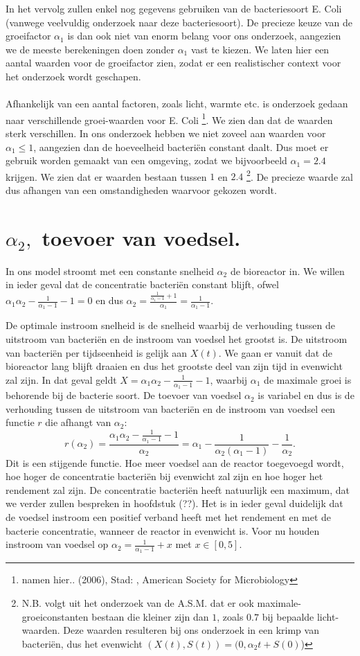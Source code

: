 In het vervolg zullen enkel nog gegevens gebruiken van de bacteriesoort E. Coli (vanwege veelvuldig onderzoek naar deze bacteriesoort). De precieze keuze van de groeifactor $\alpha_1$ is dan ook niet van enorm belang voor ons onderzoek, aangezien we de meeste berekeningen doen zonder $\alpha_1$ vast te kiezen. We laten hier een aantal waarden voor de groeifactor zien, zodat er een realistischer context voor het onderzoek wordt geschapen. 
\\
\\
Afhankelijk van een aantal factoren, zoals licht, warmte etc. is onderzoek gedaan naar verschillende groei-waarden voor E. Coli \footnote{namen hier.. (2006), Stad: , American Society for Microbiology}. We zien dan dat de waarden sterk verschillen. In ons onderzoek hebben we niet zoveel aan waarden voor $\alpha_1\leq1$, aangezien dan de hoeveelheid bacteri\"en constant daalt. Dus moet er gebruik worden gemaakt van een omgeving, zodat we bijvoorbeeld $\alpha_1 = 2.4$ krijgen. We zien dat er waarden bestaan tussen $1$ en $2.4$ \footnote{N.B. volgt uit het onderzoek van de A.S.M. dat er ook maximale-groeiconstanten bestaan die kleiner zijn dan $1$, zoals $0.7$ bij bepaalde licht-waarden. Deze waarden resulteren bij ons onderzoek in een krimp van bacteri\"en, dus het evenwicht $(X(t), S(t)) = (0, \alpha_2t + S(0)$) }. De precieze waarde zal dus afhangen van een omstandigheden waarvoor gekozen wordt.


\section{$\alpha_2,$ toevoer van voedsel.}
In ons model stroomt met een constante snelheid $\alpha_2$ de bioreactor in. We willen in ieder geval dat de concentratie bacteri\"en constant blijft, ofwel $\alpha_1\alpha_2-\frac{1}{\alpha_1-1}-1 = 0$ en dus $\alpha_2 = \frac{\frac{1}{\alpha_1-1}+1}{\alpha_1}=\frac{1}{\alpha_1-1}$.

De optimale instroom snelheid is de snelheid waarbij de verhouding tussen de uitstroom van bacteri\"en en de instroom van voedsel het grootst is. De uitstroom van bacteri\"en per tijdseenheid is gelijk aan $X(t)$. We gaan er vanuit dat de bioreactor lang blijft draaien en dus het grootste deel van zijn tijd in evenwicht zal zijn. In dat geval geldt $X = \alpha_1\alpha_2-\frac{1}{\alpha_1-1}-1$, waarbij $\alpha_1$ de maximale groei is behorende bij de bacterie soort. De toevoer van voedsel $\alpha_2$ is variabel en dus is de verhouding tussen de uitstroom van bacteri\"en en de instroom van voedsel een functie $r$ die afhangt van $\alpha_2$:
\[r(\alpha_2) = \frac{\alpha_1\alpha_2-\frac{1}{\alpha_1-1}-1}{\alpha_2} = \alpha_1-\frac{1}{\alpha_2(\alpha_1-1)}-\frac{1}{\alpha_2}.\]
Dit is een stijgende functie. Hoe meer voedsel aan de reactor toegevoegd wordt, hoe hoger de concentratie bacteri\"en bij evenwicht zal zijn en hoe hoger het rendement zal zijn. De concentratie bacteri\"en heeft natuurlijk een maximum, dat we verder zullen bespreken in hoofdstuk (??). Het is in ieder geval duidelijk dat de voedsel instroom een positief verband heeft met het rendement en met de bacterie concentratie, wanneer de reactor in evenwicht is. Voor nu houden instroom van voedsel op $\alpha_2 = \frac{1}{\alpha_1-1} + x$ met $x\in[0, 5]$.

